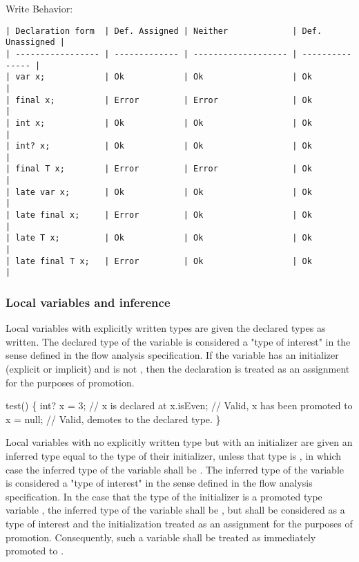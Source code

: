 \documentclass[makeidx]{article}
\begin{document}
Write Behavior:

\begin{verbatim}
| Declaration form  | Def. Assigned | Neither             | Def. Unassigned |
| ----------------- | ------------- | ------------------- | --------------- |
| var x;            | Ok            | Ok                  | Ok              |
| final x;          | Error         | Error               | Ok              |
| int x;            | Ok            | Ok                  | Ok              |
| int? x;           | Ok            | Ok                  | Ok              |
| final T x;        | Error         | Error               | Ok              |
| late var x;       | Ok            | Ok                  | Ok              |
| late final x;     | Error         | Ok                  | Ok              |
| late T x;         | Ok            | Ok                  | Ok              |
| late final T x;   | Error         | Ok                  | Ok              |
\end{verbatim}

\subsubsection{Local variables and inference}

Local variables with explicitly written types are given the declared types as
written.  The declared type of the variable is considered a "type of interest"
in the sense defined in the flow analysis specification.  If the variable has an
initializer (explicit or implicit) and is not \FINAL, then the declaration is
treated as an assignment for the purposes of promotion.


\begin{dartCode}
\VOID test() \{
  int? x = 3; // x is declared at 
  x.isEven; // Valid, x has been promoted to 
  x = null; // Valid, demotes to the declared type.
\}
\end{dartCode}

Local variables with no explicitly written type but with an initializer are
given an inferred type equal to the type of their initializer, unless that type
is , in which case the inferred type of the variable shall be \DYNAMIC.
The inferred type of the variable is considered a "type of interest" in the
sense defined in the flow analysis specification.  In the case that the type of
the initializer is a promoted type variable , the inferred type of the
variable shall be , but  shall be considered as a type of interest and
the initialization treated as an assignment for the purposes of promotion.
Consequently, such a variable shall be treated as immediately promoted to .
\end{document}
